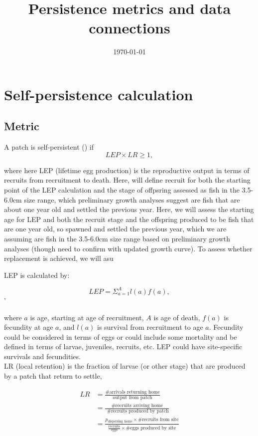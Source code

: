 \documentclass[12pt, oneside]{article}   	%
\title{Persistence metrics and data connections}
\begin{document}
\date{\today}
\maketitle{}
\section{Self-persistence calculation}
\subsection*{Metric}
A patch is self-persistent (\cite{burgess2014beyond}) if
\begin{equation}
LEP \times LR \geq 1,
\end{equation}

where here LEP (lifetime egg production) is the reproductive output in terms of recruits from recruitment to death. Here, will define recruit for both the starting point of the LEP calculation and the stage of offpsring assessed as fish in the 3.5-6.0cm size range, which preliminary growth analyses suggest are fish that are about one year old and settled the previous year. Here, we will assess the starting age for LEP and  both the recruit stage and the offspring produced to be fish that are one year old, so spawned and settled the previous year, which we are assuming are fish in the 3.5-6.0cm size range based on preliminary growth analyses (though need to confirm with updated growth curve). To assess whether replacement is achieved, we will asu


LEP is calculated by:

\begin{equation}
LEP = \Sigma_{a = 1}^{A} l(a)f(a),
\end{equation}{}'

where $a$ is age, starting at age of recruitment, $A$ is age of death, $f(a)$ is fecundity at age $a$, and $l(a)$ is survival from recruitment to age $a$. Fecundity could be considered in terms of eggs or could include some mortality and be defined in terms of larvae, juveniles, recruits, etc. LEP could have site-specific survivals and fecundities.\\ %

LR (local retention) is the fraction of larvae (or other stage) that are produced by a patch that return to settle,

\begin{equation}
\begin{split}
LR & = \frac{\text{\# arrivals returning home}}{\text{output from patch}} \\
& = \frac{\text{\# recruits arriving home}}{\text{ \# recruits produced by patch}} \\
& = \frac{p_{\text{dispersing home}} \times \text{\# recruits from site}}{\frac{\text{recruits}}{\text{eggs}} \times \text{\# eggs produced by site}}
\end{split}
\end{equation}
\end{document}
